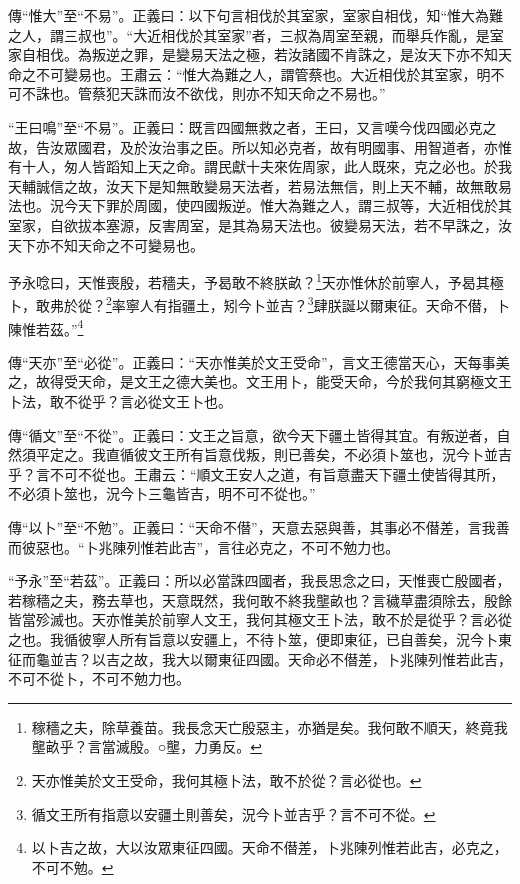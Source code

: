 {\noindent\zhuan{}\fzbyks 傳“惟大”至“不易”。正義曰：以下句言相伐於其室家，室家自相伐，知“惟大為難之人，謂三叔也”。“大近相伐於其室家”者，三叔為周室至親，而舉兵作亂，是室家自相伐。為叛逆之罪，是變易天法之極，若汝諸國不肯誅之，是汝天下亦不知天命之不可變易也。王肅云：“惟大為難之人，謂管蔡也。大近相伐於其室家，明不可不誅也。管蔡犯天誅而汝不欲伐，則亦不知天命之不易也。” \par}

{\noindent\shu{}\fzkt “王曰鳴”至“不易”。正義曰：既言四國無救之者，王曰，又言嘆今伐四國必克之故，告汝眾國君，及於汝治事之臣。所以知必克者，故有明國事、用智道者，亦惟有十人，匆人皆蹈知上天之命。謂民獻十夫來佐周家，此人既來，克之必也。於我天輔誠信之故，汝天下是知無敢變易天法者，若易法無信，則上天不輔，故無敢易法也。況今天下罪於周國，使四國叛逆。惟大為難之人，謂三叔等，大近相伐於其室家，自欲拔本塞源，反害周室，是其為易天法也。彼變易天法，若不早誅之，汝天下亦不知天命之不可變易也。 \par}

予永唸曰，天惟喪殷，若穡夫，予曷敢不終朕畝？\footnote{稼穡之夫，除草養苗。我長念天亡殷惡主，亦猶是矣。我何敢不順天，終竟我壟畝乎？言當滅殷。○壟，力勇反。}天亦惟休於前寧人，予曷其極卜，敢弗於從？\footnote{天亦惟美於文王受命，我何其極卜法，敢不於從？言必從也。}率寧人有指疆土，矧今卜並吉？\footnote{循文王所有指意以安疆土則善矣，況今卜並吉乎？言不可不從。}肆朕誕以爾東征。天命不僣，卜陳惟若茲。”\footnote{以卜吉之故，大以汝眾東征四國。天命不僣差，卜兆陳列惟若此吉，必克之，不可不勉。}


{\noindent\zhuan{}\fzbyks 傳“天亦”至“必從”。正義曰：“天亦惟美於文王受命”，言文王德當天心，天每事美之，故得受天命，是文王之德大美也。文王用卜，能受天命，今於我何其窮極文王卜法，敢不從乎？言必從文王卜也。 \par}

{\noindent\zhuan{}\fzbyks 傳“循文”至“不從”。正義曰：文王之旨意，欲今天下疆土皆得其宜。有叛逆者，自然須平定之。我直循彼文王所有旨意伐叛，則已善矣，不必須卜筮也，況今卜並吉乎？言不可不從也。王肅云：“順文王安人之道，有旨意盡天下疆土使皆得其所，不必須卜筮也，況今卜三龜皆吉，明不可不從也。” \par}

{\noindent\zhuan{}\fzbyks 傳“以卜”至“不勉”。正義曰：“天命不僣”，天意去惡與善，其事必不僣差，言我善而彼惡也。“卜兆陳列惟若此吉”，言往必克之，不可不勉力也。 \par}

{\noindent\shu{}\fzkt “予永”至“若茲”。正義曰：所以必當誅四國者，我長思念之曰，天惟喪亡殷國者，若稼穡之夫，務去草也，天意既然，我何敢不終我壟畝也？言穢草盡須除去，殷餘皆當殄滅也。天亦惟美於前寧人文王，我何其極文王卜法，敢不於是從乎？言必從之也。我循彼寧人所有旨意以安疆上，不待卜筮，便即東征，已自善矣，況今卜東征而龜並吉？以吉之故，我大以爾東征四國。天命必不僣差，卜兆陳列惟若此吉，不可不從卜，不可不勉力也。 \par}

